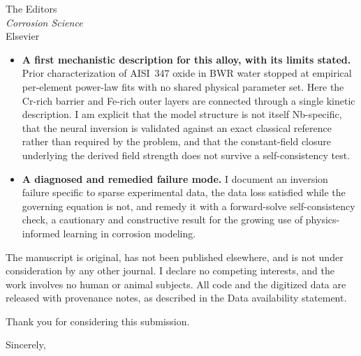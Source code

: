 \documentclass[11pt]{letter}
\begin{document}
\begin{letter}{The Editors \\ \textit{Corrosion Science} \\ Elsevier}
\begin{itemize}
\item \textbf{A first mechanistic description for this alloy, with its limits stated.} Prior characterization of AISI~347 oxide in BWR water stopped
at empirical per-element power-law fits with no shared physical
parameter set. Here the Cr-rich barrier and Fe-rich outer layers are
connected through a single kinetic description. I am explicit that the
model structure is not itself Nb-specific, that the neural inversion is
validated against an exact classical reference rather than required by
the problem, and that the constant-field closure underlying the derived
field strength does not survive a self-consistency test.

\item \textbf{A diagnosed and remedied failure mode.} I document an
inversion failure specific to sparse experimental data, the data loss satisfied while the governing equation is not, and remedy it with a
forward-solve self-consistency check, a cautionary and constructive
result for the growing use of physics-informed learning in corrosion
modeling.
\end{itemize}

The manuscript is original, has not been published elsewhere, and is not
under consideration by any other journal. I declare no competing
interests, and the work involves no human or animal subjects. All code
and the digitized data are released with provenance notes, as described
in the Data availability statement.

Thank you for considering this submission.

\closing{Sincerely,}

\end{letter}
\end{document}

